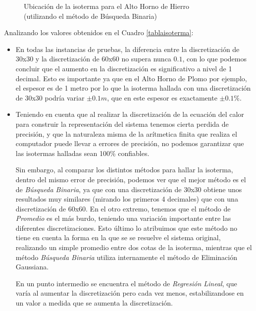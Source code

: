 \begin{figure}[H]
    \begin{center}
        \captionsetup{justification=centering}
        \caption{Ubicación de la isoterma para el Alto Horno de Hierro\\ (utilizando el método de Búsqueda Binaria)}
        \label{fig:isoterma_binaria_hierro_1}
    \end{center}
\end{figure}

Analizando los valores obtenidos en el Cuadro \ref{tablaisoterma}:
\begin{itemize}
    \item En todas las instancias de pruebas, la diferencia entre la discretización de 30x30 y la discretización de 60x60 no supera nunca $0.1$, con lo que podemos concluir que el aumento en la discretización es significativo a nivel de 1 decimal. Esto es importante ya que en el Alto Horno de Plomo por ejemplo, el espesor es de 1 metro por lo que la isoterma hallada con una discretización de 30x30 podría variar $\pm 0.1m$, que en este espesor es exactamente $\pm 0.1\%$.
    \item Teniendo en cuenta que al realizar la discretización de la ecuación del calor para construir la representación del sistema tenemos cierta perdida de precisión, y que la naturaleza misma de la arítmetica finita que realiza el computador puede llevar a errores de precisión, no podemos garantizar que las isotermas halladas sean 100\% confiables.

        Sin embargo, al comparar los distintos métodos para hallar la isoterma, dentro del mismo error de precisión, podemos ver que el mejor método es el de \textit{Búsqueda Binaria}, ya que con una discretización de 30x30 obtiene unos resultados muy similares (mirando los primeros 4 decimales) que con una discretización de 60x60. En el otro extremo, tenemos que el método de \textit{Promedio} es el más burdo, teniendo una variación importante entre las diferentes discretizaciones. Esto último lo atribuimos que este método no tiene en cuenta la forma en la que se se resuelve el sistema original, realizando un simple promedio entre dos cotas de la isoterma, mientras que el método \textit{Búsqueda Binaria} utiliza internamente el método de Eliminación Gaussiana.

        En un punto intermedio se encuentra el método de \textit{Regresión Lineal}, que varía al aumentar la discretización pero cada vez menos, estabilizandose en un valor a medida que se aumenta la discretización.
\end{itemize}

